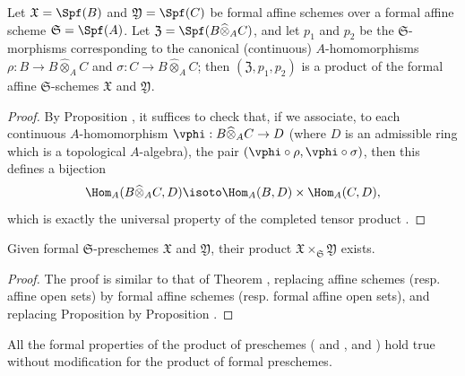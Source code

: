 \begin{proposition}[10.7.2]
\label{I.10.7.2}
Let $\mathfrak{X}=\Spf(B)$ and $\mathfrak{Y}=\Spf(C)$ be formal affine schemes over a formal affine scheme $\mathfrak{S}=\Spf(A)$.
Let $\mathfrak{Z}=\Spf(B\widehat{\otimes}_A C)$, and let $p_1$ and $p_2$ be the $\mathfrak{S}$-morphisms corresponding  to the canonical (continuous) $A$-homomorphisms $\rho: B\to B\widehat{\otimes}_A C$ and $\sigma:C\to B\widehat{\otimes}_A C$; then $(\mathfrak{Z},p_1,p_2)$ is a product of the formal affine $\mathfrak{S}$-schemes $\mathfrak{X}$ and $\mathfrak{Y}$.
\end{proposition}

\begin{proof}
By Proposition , it suffices to check that, if we associate, to each continuous $A$-homomorphism $\vphi:B\widehat{\otimes}_A C\to D$ (where $D$ is an admissible ring which is a topological $A$-algebra), the pair $(\vphi\circ\rho,\vphi\circ\sigma)$, then this defines a bijection
\[
  \Hom_A(B\widehat{\otimes}_A C,D)\isoto\Hom_A(B,D)\times\Hom_A(C,D),
\]
which is exactly the universal property of the completed tensor product .
\end{proof}

\begin{proposition}[10.7.3]
\label{I.10.7.3}
Given formal $\mathfrak{S}$-preschemes $\mathfrak{X}$ and $\mathfrak{Y}$, their product $\mathfrak{X}\times_\mathfrak{S}\mathfrak{Y}$ exists.
\end{proposition}

\begin{proof}
The proof is similar to that of Theorem , replacing affine schemes (resp. affine open sets) by formal affine schemes (resp. formal affine open sets), and replacing Proposition  by Proposition .
\end{proof}

All the formal properties of the product of preschemes ( and ,  and ) hold true without modification for the product of formal preschemes.

